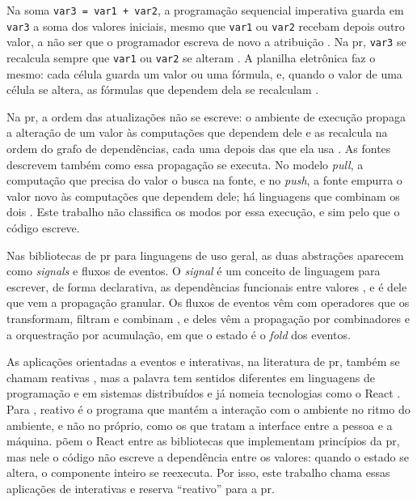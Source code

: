 Na soma \texttt{var3 = var1 + var2}, a programação sequencial imperativa guarda
em \texttt{var3} a soma dos valores iniciais, mesmo que \texttt{var1} ou \texttt{var2} recebam
depois outro valor, a não ser que o programador escreva de novo a
atribuição \cite[p. 52:3]{bainomugisha2013}.
Na \gls{pr}, \texttt{var3} se recalcula sempre que \texttt{var1} ou \texttt{var2} se
alteram \cite[p. 52:3]{bainomugisha2013}.
A planilha eletrônica faz o mesmo: cada célula guarda um valor ou uma
fórmula, e, quando o valor de uma célula se altera, as fórmulas que
dependem dela se recalculam \cite[p. 52:2]{bainomugisha2013}.

Na \gls{pr}, a ordem das atualizações não se escreve: o ambiente de
execução propaga a alteração de um valor às computações que dependem dele
e as recalcula na ordem do grafo de dependências, cada uma depois das que
ela usa \cite[p. 52:4 e 52:7]{bainomugisha2013}.
As fontes descrevem também como essa propagação se executa.
No modelo \emph{pull}, a computação que precisa do valor o busca na fonte, e no \emph{push},
a fonte empurra o valor novo às computações que dependem dele; há
linguagens que combinam os dois \cite[p. 52:6-52:7]{bainomugisha2013}.
Este trabalho não classifica os modos por essa execução, e sim pelo que o
código escreve.

Nas bibliotecas de \gls{pr} para linguagens de uso geral, as duas
abstrações aparecem como \emph{signals} e fluxos de eventos.
O \emph{signal} é um conceito de linguagem para escrever, de forma declarativa,
as dependências funcionais entre valores \cite[p. 1126]{salvaneschi2017},
e é dele que vem a propagação granular.
Os fluxos de eventos vêm com operadores que os transformam, filtram e
combinam \cite[p. 1126]{salvaneschi2017}, e deles vêm a propagação por
combinadores e a orquestração por acumulação, em que o estado é o \emph{fold}
dos eventos.

As aplicações orientadas a eventos e interativas, na literatura de
\gls{pr}, também se chamam reativas \cite[p. 1125]{salvaneschi2017}, mas
a palavra tem sentidos diferentes em linguagens de programação e em sistemas
distribuídos \cite[p. 5:1]{myter2019} e já nomeia tecnologias como o React
\cite[p. 13]{grolaux2026}.
Para \textcite{berry1989}, reativo é o programa que mantém a interação
com o ambiente no ritmo do ambiente, e não no próprio, como os que tratam
a interface entre a pessoa e a máquina.
\textcite[p. 564]{salvaneschi2014} põem o React entre as bibliotecas que
implementam princípios da \gls{pr}, mas nele o código não escreve a
dependência entre os valores: quando o estado se altera, o componente
inteiro se reexecuta.
Por isso, este trabalho chama essas aplicações de interativas e reserva
“reativo” para a \gls{pr}.

